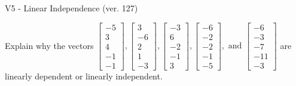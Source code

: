 \begin{exercise}
  \begin{exerciseTitle}V5 - Linear Independence (ver. 127)\end{exerciseTitle}
  \begin{exerciseStatement}
    Explain why the vectors \(\left[\begin{array}{r}
-5 \\
3 \\
4 \\
-1 \\
-1
\end{array}\right] , \left[\begin{array}{r}
3 \\
-6 \\
2 \\
1 \\
-3
\end{array}\right] , \left[\begin{array}{r}
-3 \\
6 \\
-2 \\
-1 \\
3
\end{array}\right] , \left[\begin{array}{r}
-6 \\
-2 \\
-2 \\
-1 \\
-5
\end{array}\right] , \text{ and } \left[\begin{array}{r}
-6 \\
-3 \\
-7 \\
-11 \\
-3
\end{array}\right]\) are linearly dependent or linearly independent.	



\end{exerciseStatement}
\end{exercise}
